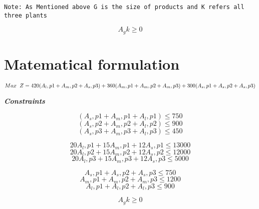 \documentclass[
]{article}
\begin{document}
\begin{verbatim}
Note: As Mentioned above G is the size of products and K refers all three plants 
\end{verbatim}

\[ A_gk \ge 0 \]

\hypertarget{matematical-formulation-1}{%
\section{Matematical formulation}\label{matematical-formulation-1}}

\[ Max \hspace{.2cm} Z = 420(A_l,p1+A_m,p2+A_s,p3)+360(A_m,p1+A_m,p2+A_m,p3)+300(A_s,p1+A_s,p2+A_s,p3)\]

\textbf{\emph{Constraints}}

\[ (A_s,p1+A_m,p1+A_l,p1) \le 750 \]
\[ (A_s,p2+A_m,p2+A_l,p2) \le 900 \]
\[ (A_s,p3+A_m,p3+A_l,p3) \le 450 \]

\[ 20A_l,p1+15A_m,p1+12A_s,p1 \le 13000 \]
\[ 20A_l,p2+15A_m,p2+12A_s,p2 \le 12000 \]
\[ 20A_l,p3+15A_m,p3+12A_s,p3 \le 5000 \]

\[A_s,p1+A_s,p2+A_s,p3 \le 750 \] \[A_m,p1+A_m,p2+A_m,p3 \le 1200 \]
\[A_l,p1+A_l,p2+A_l,p3 \le 900 \]

\[ A_gk \ge 0 \]
\end{document}
